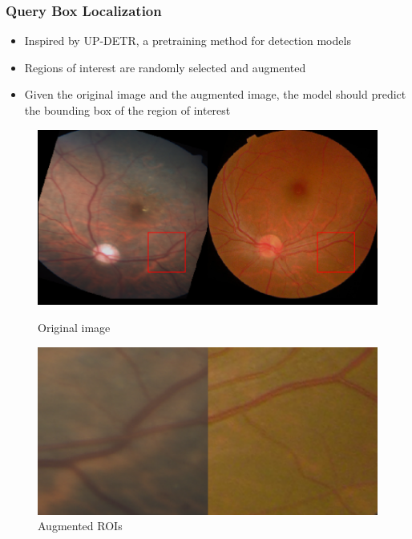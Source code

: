 \documentclass{beamer}
\begin{document}
\begin{frame}
   \frametitle{Query Box Localization}
   \begin{itemize}
        \item Inspired by UP-DETR, a pretraining method for detection models \cite{Dai_2022}
        \item Regions of interest are randomly selected and augmented
        \item Given the original image and the augmented image, the model should predict the bounding box of the region of interest
   \end{itemize}
   \begin{figure}
       \centering
       \begin{minipage}{0.45\textwidth}
           \centering
           \includegraphics[width=\textwidth]{query_box_1.png}
           \caption{Original image}
       \end{minipage}\hfill
       \begin{minipage}{0.45\textwidth}
           \centering
           \includegraphics[width=\textwidth]{query_box_2.png}
           \caption{Augmented ROIs}
       \end{minipage}
   \end{figure}
\end{frame}
\end{document}
